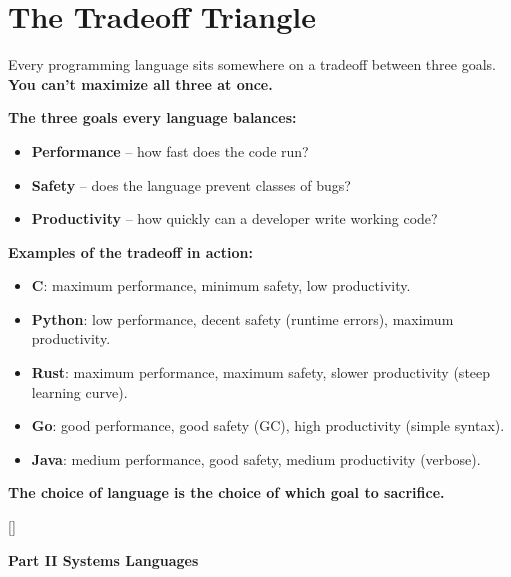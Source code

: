 \documentclass[11pt, letterpaper]{article}
\newcommand{\redsections}{%
  \titleformat{\section}{\large\bfseries\color{sectionred}}{}{0em}{}[\color{sectionred}\titlerule]%
  \titleformat{\subsection}{\normalsize\bfseries\color{sectionred!80!black}}{}{0em}{}%
}
\newcommand{\partbanner}[3]{%
  \begin{tcolorbox}[colback=#1, colframe=#2, boxrule=1.2pt, arc=4pt,
    left=8pt, right=8pt, top=6pt, bottom=6pt]
    \begin{center}{\LARGE\bfseries #3}\end{center}
  \end{tcolorbox}%
}
\begin{document}
\section*{The Tradeoff Triangle}

Every programming language sits somewhere on a tradeoff between three goals. \textbf{You can't maximize all three at once.}

\begin{tcolorbox}[colback=part3bg, colframe=sectionpurple, arc=3pt, boxrule=1pt]
\textbf{The three goals every language balances:}
\begin{itemize}[noitemsep, leftmargin=*]
  \item \textbf{Performance} -- how fast does the code run?
  \item \textbf{Safety} -- does the language prevent classes of bugs?
  \item \textbf{Productivity} -- how quickly can a developer write working code?
\end{itemize}
\textbf{Examples of the tradeoff in action:}
\begin{itemize}[noitemsep, leftmargin=*]
  \item \textbf{C}: maximum performance, minimum safety, low productivity.
  \item \textbf{Python}: low performance, decent safety (runtime errors), maximum productivity.
  \item \textbf{Rust}: maximum performance, maximum safety, slower productivity (steep learning curve).
  \item \textbf{Go}: good performance, good safety (GC), high productivity (simple syntax).
  \item \textbf{Java}: medium performance, good safety, medium productivity (verbose).
\end{itemize}
\textbf{The choice of language is the choice of which goal to sacrifice.}
\end{tcolorbox}

\newpage

\redsections
{}
\partbanner{part6bg}{sectionred}{Part II \quad Systems Languages}
\end{document}
